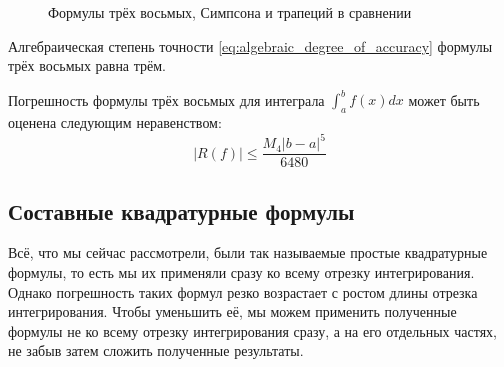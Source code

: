 \documentclass[../main.tex]{subfile}
\begin{document}
\begin{figure}[ht]
	\caption*{Формулы трёх восьмых, Симпсона и трапеций в сравнении}
\end{figure}

\begin{lemma}
	Алгебраическая степень точности \eqref{eq:algebraic_degree_of_accuracy}
	формулы трёх восьмых равна трём.
\end{lemma}
\proofexercise

\begin{theorem}
	Погрешность формулы трёх восьмых для интеграла $\int_a^b f(x)dx$ может
	быть оценена следующим неравенством:
	\[\boxed{|R(f)|\le\frac{M_4|b-a|^5}{6480}}\]
\end{theorem}
\proofexercise\newpage

\subsection{Составные квадратурные формулы}
Всё, что мы сейчас рассмотрели, были так называемые простые квадратурные
формулы, то есть мы их применяли сразу ко всему отрезку интегрирования. Однако
погрешность таких формул резко возрастает с ростом длины отрезка интегрирования.
Чтобы уменьшить её, мы можем применить полученные формулы не ко всему отрезку
интегрирования сразу, а на его отдельных частях, не забыв затем сложить
полученные результаты.
\end{document}
